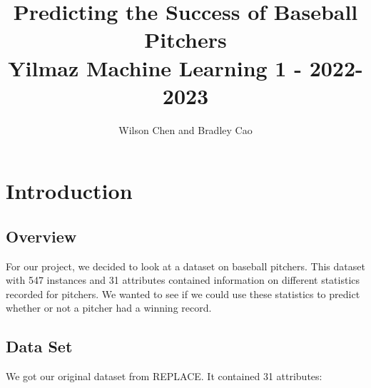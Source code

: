 \documentclass[12pt]{article}
\title{Predicting the Success of Baseball Pitchers \\ 
        \large Yilmaz Machine Learning 1 - 2022-2023}
\author{Wilson Chen and Bradley Cao}
\date{}
\begin{document}
\maketitle
\newpage{}
\section{Introduction}
\subsection{Overview}
For our project, we decided to look at a dataset on baseball pitchers. This dataset with 547 instances and 31 attributes contained information on different statistics recorded for pitchers. We wanted to see if we could use these statistics to predict whether or not a pitcher had a winning record. 
\subsection{Data Set}
We got our original dataset from REPLACE. It contained 31 attributes: 
\end{document}
